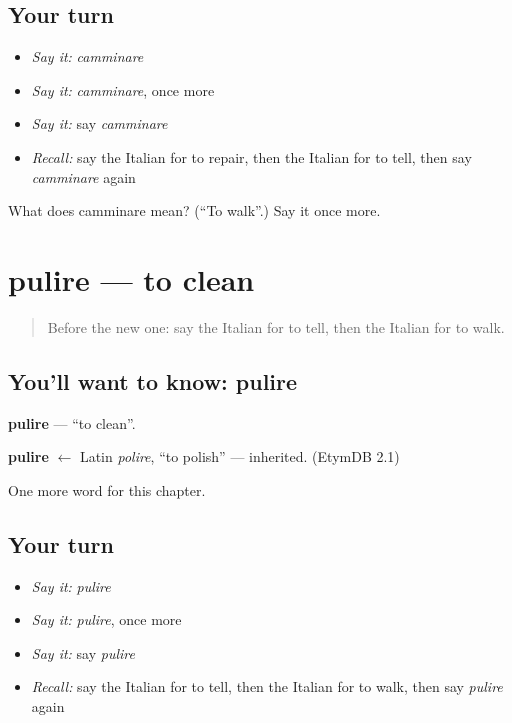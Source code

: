 \subsection*{Your turn}
\begin{itemize}
\raggedright
  \item \emph{Say it:} \emph{camminare}
  \item \emph{Say it:} \emph{camminare}, once more
  \item \emph{Say it:} say \emph{camminare}
  \item \emph{Recall:} say the Italian for to repair, then the Italian for to tell, then say \emph{camminare} again
\end{itemize}

\begin{tcolorbox}[breakable,colback=teal!4,colframe=teal!35!black,title={Before you move on}]
What does camminare mean? (\textquotedblleft{}To walk\textquotedblright{}.) Say it once more.
\end{tcolorbox}
\section[pulire]{pulire — to clean}

\label{lesson:IT-C136-pulire}



\begin{quote}
Before the new one: say the Italian for to tell, then the Italian for to walk.
\end{quote}

\subsection*{You'll want to know: pulire}
\textbf{pulire} — \textquotedblleft{}to clean\textquotedblright{}.

\begin{cousinweb}
\textbf{pulire} $\leftarrow$ Latin \emph{polire}, \textquotedblleft{}to polish\textquotedblright{} — inherited. (EtymDB 2.1)
\end{cousinweb}

\begin{grammarlens}[title={What you've built}]
One more word for this chapter.
\end{grammarlens}

\subsection*{Your turn}
\begin{itemize}
\raggedright
  \item \emph{Say it:} \emph{pulire}
  \item \emph{Say it:} \emph{pulire}, once more
  \item \emph{Say it:} say \emph{pulire}
  \item \emph{Recall:} say the Italian for to tell, then the Italian for to walk, then say \emph{pulire} again
\end{itemize}

